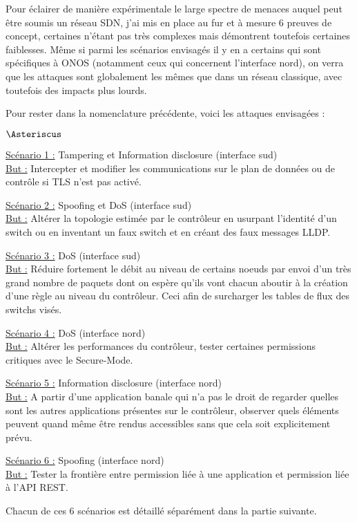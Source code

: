 Pour éclairer de manière expérimentale le large spectre de menaces auquel peut être soumis un réseau SDN, j'ai mis en place au fur et à mesure 6 preuves de concept, certaines n'étant pas très complexes mais démontrent toutefois certaines faiblesses. Même si parmi les scénarios envisagés il y en a certains qui sont spécifiques à ONOS (notamment ceux qui concernent l'interface nord), on verra que les attaques sont globalement les mêmes que dans un réseau classique, avec toutefois des impacts plus lourds.

Pour rester dans la nomenclature précédente, voici les attaques envisagées :

\begin{list}{$\Asteriscus$}{}

\item \underline{Scénario 1 :} Tampering et Information disclosure (interface sud) \\
\underline{But :} Intercepter et modifier les communications sur le plan de données ou de contrôle si TLS n'est pas activé.

\item \underline{Scénario 2 :} Spoofing et DoS (interface sud) \\
\underline{But :} Altérer la topologie estimée par le contrôleur en usurpant l'identité d'un switch ou en inventant un faux switch et en créant des faux messages LLDP.

\item \underline{Scénario 3 :} DoS (interface sud) \\
\underline{But :} Réduire fortement le débit au niveau de certains noeuds par envoi d'un très grand nombre de paquets dont on espère qu'ils vont chacun aboutir à la création d'une règle au niveau du contrôleur. Ceci afin de surcharger les tables de flux des switchs visés.

\item \underline{Scénario 4 :} DoS (interface nord) \\
\underline{But :} Altérer les performances du contrôleur, tester certaines permissions critiques avec le Secure-Mode.

\item \underline{Scénario 5 :} Information disclosure (interface nord) \\
\underline{But :} A partir d'une application banale qui n'a pas le droit de regarder quelles sont les autres applications présentes sur le contrôleur, observer quels éléments peuvent quand même être rendus accessibles sans que cela soit explicitement prévu.

\item \underline{Scénario 6 :} Spoofing (interface nord) \\
\underline{But :} Tester la frontière entre permission liée à une application et permission liée à l'API REST.

\end{list}

Chacun de ces 6 scénarios est détaillé séparément dans la partie suivante.